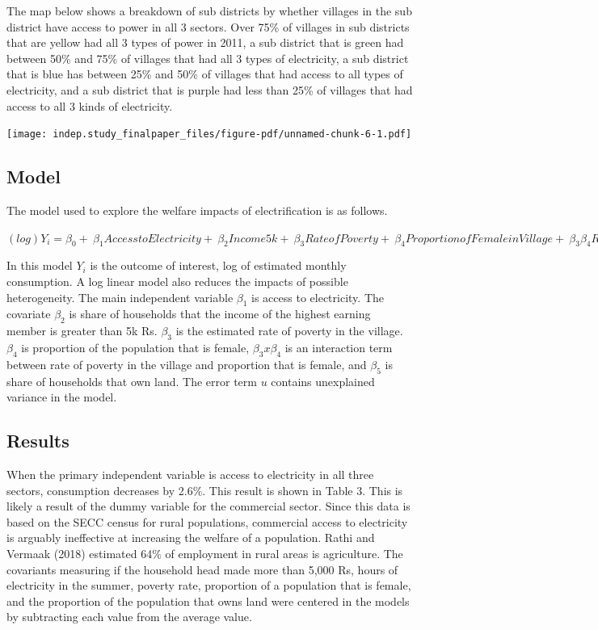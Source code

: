 \documentclass[
]{article}
\begin{document}
\newpage

The map below shows a breakdown of sub districts by whether villages in
the sub district have access to power in all 3 sectors. Over 75\% of
villages in sub districts that are yellow had all 3 types of power in
2011, a sub district that is green had between 50\% and 75\% of villages
that had all 3 types of electricity, a sub district that is blue has
between 25\% and 50\% of villages that had access to all types of
electricity, and a sub district that is purple had less than 25\% of
villages that had access to all 3 kinds of electricity.

\texttt{[image: indep.study\_finalpaper\_files/figure-pdf/unnamed-chunk-6-1.pdf]}

\hypertarget{model}{%
\subsection{Model}\label{model}}

The model used to explore the welfare impacts of electrification is as
follows.

\((log)Y_i = \beta_0 + \ \beta_1AccesstoElectricity + \ \beta_2Income5k + \ \beta_3RateofPoverty + \ \beta_4ProportionofFemaleinVillage + \ \beta_3\beta_4RateofPovertyxProportionFemale + \ \beta_5OwnLand + \ u\)

In this model \(Y_i\) is the outcome of interest, log of estimated
monthly consumption. A log linear model also reduces the impacts of
possible heterogeneity. The main independent variable \(\beta_1\) is
access to electricity. The covariate \(\beta_2\) is share of households
that the income of the highest earning member is greater than 5k Rs.
\(\beta_3\) is the estimated rate of poverty in the village. \(\beta_4\)
is proportion of the population that is female, \(\beta_3x\beta_4\) is
an interaction term between rate of poverty in the village and
proportion that is female, and \(\beta_5\) is share of households that
own land. The error term \(u\) contains unexplained variance in the
model.

\hypertarget{results}{%
\subsection{Results}\label{results}}

When the primary independent variable is access to electricity in all
three sectors, consumption decreases by 2.6\%. This result is shown in
Table 3. This is likely a result of the dummy variable for the
commercial sector. Since this data is based on the SECC census for rural
populations, commercial access to electricity is arguably ineffective at
increasing the welfare of a population. Rathi and Vermaak (2018)
estimated 64\% of employment in rural areas is agriculture. The
covariants measuring if the household head made more than 5,000 Rs,
hours of electricity in the summer, poverty rate, proportion of a
population that is female, and the proportion of the population that
owns land were centered in the models by subtracting each value from the
average value.
\end{document}
